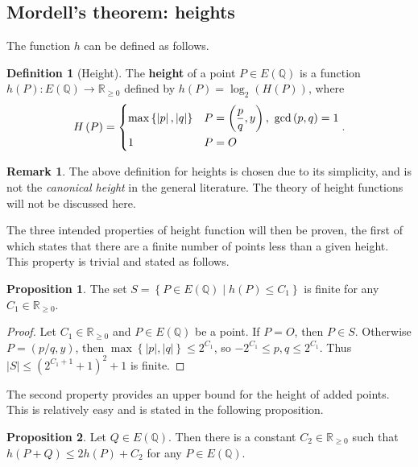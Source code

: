 \documentclass{article}
\newcommand{\Q}{\mathbb{Q}}
\newcommand{\R}{\mathbb{R}}
\newcommand{\rb}[1]{\left( #1 \right)}
\newcommand{\cb}[1]{\left\{ #1 \right\}}
\newcommand{\abs}[1]{\left\lvert #1 \right\rvert}
\theoremstyle{definition}\newtheorem*{definition}{Definition}
\theoremstyle{definition}\newtheorem*{example}{Example}
\theoremstyle{definition}\newtheorem*{remark}{Remark}
\newtheorem{proposition}{Proposition}[subsection]
\begin{document}
\pagebreak

\subsection{Mordell's theorem: heights}

The function $ h $ can be defined as follows.

\begin{definition}[Height]
The \textbf{height} of a point $ P \in E\rb{\Q} $ is a function $ h\rb{P} : E\rb{\Q} \to \R_{\ge 0} $ defined by $ h\rb{P} = \log_2\rb{H\rb{P}} $, where
$$ H\rb{P} = \begin{dcases} \max\cb{\abs{p}, \abs{q}} & P = \rb{\dfrac{p}{q}, y}, \ \gcd\rb{p, q} = 1 \\ 1 & P = O \end{dcases}. $$
\end{definition}

\begin{remark}
The above definition for heights is chosen due to its simplicity, and is not the \emph{canonical height} in the general literature. The theory of height functions will not be discussed here.
\end{remark}

The three intended properties of height function will then be proven, the first of which states that there are a finite number of points less than a given height. This property is trivial and stated as follows.

\begin{proposition}
\label{prop:finiteness}
The set $ S = \cb{P \in E\rb{\Q} \mid h\rb{P} \le C_1} $ is finite for any $ C_1 \in \R_{\ge 0} $.
\end{proposition}

\begin{proof}
Let $ C_1 \in \R_{\ge 0} $ and $ P \in E\rb{\Q} $ be a point. If $ P = O $, then $ P \in S $. Otherwise $ P = \rb{p / q, y} $, then $ \max\cb{\abs{p}, \abs{q}} \le 2^{C_1} $, so $ -2^{C_1} \le p, q \le 2^{C_1} $. Thus $ \abs{S} \le \rb{2^{C_1 + 1} + 1}^2 + 1 $ is finite.
\end{proof}

The second property provides an upper bound for the height of added points. This is relatively easy and is stated in the following proposition.

\begin{proposition}
\label{prop:upperbound}
Let $ Q \in E\rb{\Q} $. Then there is a constant $ C_2 \in \R_{\ge 0} $ such that $ h\rb{P + Q} \le 2h\rb{P} + C_2 $ for any $ P \in E\rb{\Q} $.
\end{proposition}
\end{document}
